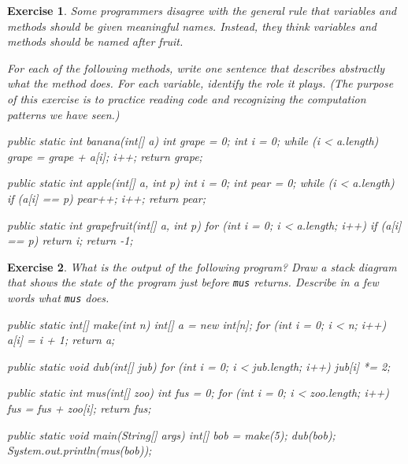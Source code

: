\documentclass[12pt]{book}
\theoremstyle{exercise}
\newtheorem{exercise}{Exercise}[chapter]
\newcommand{\java}[1]{\verb"#1"}
\newcommand{\java}[1]{\lstinline{#1}} %
\begin{document}
\begin{exercise}
Some programmers disagree with the general rule that variables and methods should be given meaningful names.
Instead, they think variables and methods should be named after fruit.

For each of the following methods, write one sentence that describes abstractly what the method does.
For each variable, identify the role it plays.
(The purpose of this exercise is to practice reading code and recognizing the computation patterns we have seen.)

\begin{code}
    public static int banana(int[] a) {
        int grape = 0;
        int i = 0;
        while (i < a.length) {
            grape = grape + a[i];
            i++;
        }
        return grape;
    }
\end{code}

\begin{code}
    public static int apple(int[] a, int p) {
        int i = 0;
        int pear = 0;
        while (i < a.length) {
            if (a[i] == p) {
                pear++;
            }
            i++;
        }
        return pear;
    }
\end{code}

\begin{code}
    public static int grapefruit(int[] a, int p) {
        for (int i = 0; i < a.length; i++) {
            if (a[i] == p) {
                return i;
            }
        }
        return -1;
    }
\end{code}
\end{exercise}


\begin{exercise}
What is the output of the following program?
Draw a stack diagram that shows the state of the program just before \java{mus} returns.
Describe in a few words what \java{mus} does.

\begin{code}
    public static int[] make(int n) {
        int[] a = new int[n];
        for (int i = 0; i < n; i++) {
            a[i] = i + 1;
        }
        return a;
    }
\end{code}

\begin{code}
    public static void dub(int[] jub) {
        for (int i = 0; i < jub.length; i++) {
            jub[i] *= 2;
        }
    }
\end{code}

\begin{code}
    public static int mus(int[] zoo) {
        int fus = 0;
        for (int i = 0; i < zoo.length; i++) {
            fus = fus + zoo[i];
        }
        return fus;
    }
\end{code}

\begin{code}
    public static void main(String[] args) {
        int[] bob = make(5);
        dub(bob);
        System.out.println(mus(bob));
    }
\end{code}
\end{exercise}
\end{document}
